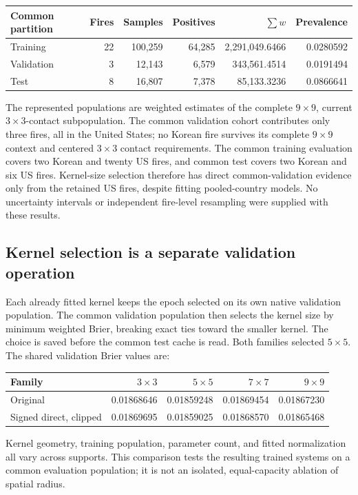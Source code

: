 \documentclass[11pt,a4paper]{article}
\begin{document}
\begin{center}
\begin{tabular}{lrrrrr}
\hline
Common partition & Fires & Samples & Positives & $\sum w$ & Prevalence\\
\hline
Training & 22 & 100,259 & 64,285 & 2,291,049.6466 & 0.0280592\\
Validation & 3 & 12,143 & 6,579 & 343,561.4514 & 0.0191494\\
Test & 8 & 16,807 & 7,378 & 85,133.3236 & 0.0866641\\
\hline
\end{tabular}
\end{center}
The represented populations are weighted estimates of the complete
$9\times9$, current $3\times3$-contact subpopulation. The common validation
cohort contributes only three fires, all in the United States; no Korean fire
survives its complete $9\times9$ context and centered $3\times3$ contact
requirements. The common training evaluation covers two Korean and twenty
US fires, and common test covers two Korean and six US fires. Kernel-size
selection therefore has direct common-validation evidence only from the
retained US fires, despite fitting pooled-country models. No uncertainty
intervals or independent fire-level resampling were supplied with these results.

\subsection{Kernel selection is a separate validation operation}

Each already fitted kernel keeps the epoch selected on its own native
validation population. The common validation population then selects the
kernel size by minimum weighted Brier, breaking exact ties toward the smaller
kernel. The choice is saved before the common test cache is read. Both
families selected $5\times5$. The shared validation Brier values are:
\begin{center}
\begin{tabular}{lrrrr}
\hline
Family & $3\times3$ & $5\times5$ & $7\times7$ & $9\times9$\\
\hline
Original & 0.01868646 & 0.01859248 & 0.01869454 & 0.01867230\\
Signed direct, clipped & 0.01869695 & 0.01859025 & 0.01868570 & 0.01865468\\
\hline
\end{tabular}
\end{center}
Kernel geometry, training population, parameter count, and fitted
normalization all vary across supports. This comparison tests the resulting
trained systems on a common evaluation population; it is not an isolated,
equal-capacity ablation of spatial radius.
\end{document}
